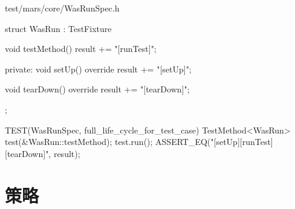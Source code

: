 \begin{content}
\begin{nodiff}{test/mars/core/WasRunSpec.h}
\begin{c++}
{  struct WasRun : TestFixture {
    void testMethod() {
      result += "[runTest]";
    }

  private:
    void setUp() override {
      result += "[setUp]";
    }

    void tearDown() override {
      result += "[tearDown]";
    }
  };
}

TEST(WasRunSpec, full_life_cycle_for_test_case) {
  TestMethod<WasRun> test(&WasRun::testMethod);
  test.run();
  ASSERT_EQ("[setUp][runTest][tearDown]", result);
}
  \end{c++}
\end{nodiff}

\end{content}

\section{策略}

